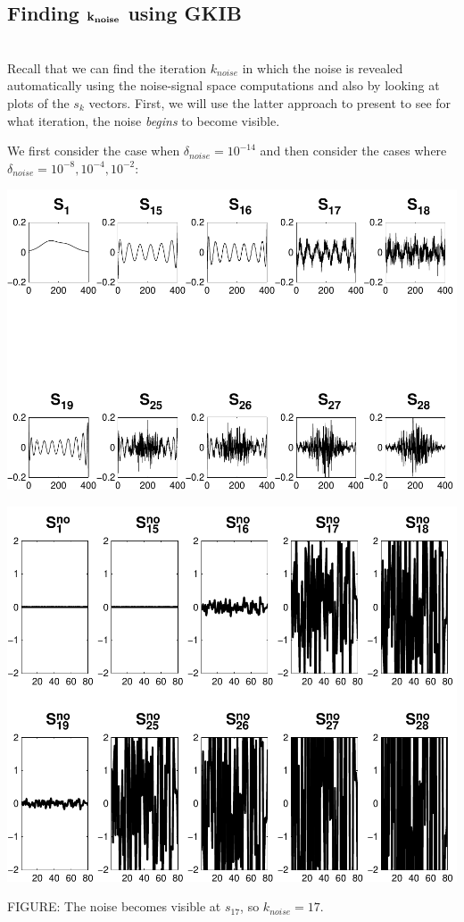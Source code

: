 \documentclass[11pt]{amsart}
\begin{document}
\subsection{Finding $\bf k_{noise}$ using GKIB} \indent \\
	Recall that we can find the iteration $k_{noise}$ in which the noise is revealed automatically
	using the noise-signal space computations and also by looking at plots of the $s_k$ vectors.
	First, we will use the latter approach to present to see for what iteration, the noise {\it begins}
    to become visible.

	We first consider the case when $\delta_{noise}=10^{-14}$ and then consider the cases
	where $\delta_{noise} = 10^{-8},10^{-4},10^{-2}$:


	\vspace{5mm}
	\begin{minipage}[t]{0.5\textwidth}
	
		\includegraphics[width=.95\linewidth]{figures/run1/sk_plots} 
   
	\end{minipage}
	\begin{minipage}[t]{0.5\textwidth}
	
		\includegraphics[width=.75\linewidth]{figures/run1/noise_parts} 
   
	\end{minipage}
	\begin{center}
		FIGURE: 
		The noise becomes visible at $s_{17}$, so $k_{noise} = 17$.
	\end{center} 
	\vspace{5mm}
\end{document}
